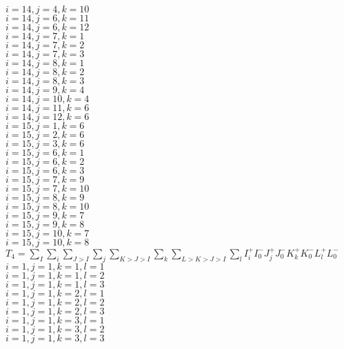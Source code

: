 \documentclass[14pt]{article}
\begin{document}
    $i=14,j=4,k=10 $ \\ 
    $i=14,j=6,k=11 $ \\ 
    $i=14,j=6,k=12 $ \\ 
    $i=14,j=7,k=1 $ \\ 
    $i=14,j=7,k=2 $ \\ 
    $i=14,j=7,k=3 $ \\ 
    $i=14,j=8,k=1 $ \\ 
    $i=14,j=8,k=2 $ \\ 
    $i=14,j=8,k=3 $ \\ 
    $i=14,j=9,k=4 $ \\ 
    $i=14,j=10,k=4 $ \\ 
    $i=14,j=11,k=6 $ \\ 
    $i=14,j=12,k=6 $ \\ 
    $i=15,j=1,k=6 $ \\ 
    $i=15,j=2,k=6 $ \\ 
    $i=15,j=3,k=6 $ \\ 
    $i=15,j=6,k=1 $ \\ 
    $i=15,j=6,k=2 $ \\ 
    $i=15,j=6,k=3 $ \\ 
    $i=15,j=7,k=9 $ \\ 
    $i=15,j=7,k=10 $ \\ 
    $i=15,j=8,k=9 $ \\ 
    $i=15,j=8,k=10 $ \\ 
    $i=15,j=9,k=7 $ \\ 
    $i=15,j=9,k=8 $ \\ 
    $i=15,j=10,k=7 $ \\ 
    $i=15,j=10,k=8 $ \\ 
    $T_4 = \displaystyle\sum_{I}\displaystyle\sum_i\displaystyle\sum_{J>I}\displaystyle\sum_j\displaystyle\sum_{K>J>I}\displaystyle\sum_k\displaystyle\sum_{L>K>J>I}\displaystyle\sum_l{I_i^+I_0^-J_j^+J_0^-K_k^+K_0^-L_l^+L_0^-} $ \\ 
    $i=1,j=1,k=1,l=1 $ \\ 
    $i=1,j=1,k=1,l=2 $ \\ 
    $i=1,j=1,k=1,l=3 $ \\ 
    $i=1,j=1,k=2,l=1 $ \\ 
    $i=1,j=1,k=2,l=2 $ \\ 
    $i=1,j=1,k=2,l=3 $ \\ 
    $i=1,j=1,k=3,l=1 $ \\ 
    $i=1,j=1,k=3,l=2 $ \\ 
    $i=1,j=1,k=3,l=3 $ \\ 
\end{document}
